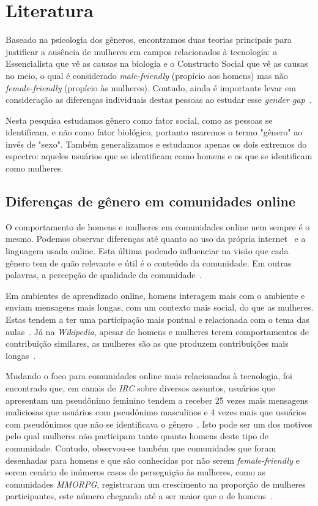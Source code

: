 \chapter{Literatura}

Baseado na psicologia dos gêneros, encontramos duas teorias principais para justificar a ausência de mulheres em campos relacionados à tecnologia: a Essencialista que vê as causas na biologia e o Constructo Social que vê as causas no meio, o qual é considerado \emph{male-friendly} (propício aos homens) mas não \emph{female-friendly} (propício às mulheres). Contudo, ainda é importante levar em consideração as diferenças individuais destas pessoas ao estudar esse \emph{gender gap}~\cite{trauth2004understanding}.

Nesta pesquisa estudamos gênero como fator social, como as pessoas se identificam, e não como fator biológico, portanto usaremos o termo "gênero" ao invés de "sexo". Também generalizamos e estudamos apenas os dois extremos do espectro: aqueles usuários que se identificam como homens e os que se identificam como mulheres. 

\section{Diferenças de gênero em comunidades online}

O comportamento de homens e mulheres em comunidades online nem sempre é o mesmo. Podemos observar diferenças até quanto ao uso da própria internet~\cite{hargittai2006differences} e a linguagem usada online. Esta última podendo influenciar na visão que cada gênero tem  de quão relevante e útil é o conteúdo da comunidade. Em outras palavras, a percepção de qualidade da comunidade~\cite{Gefen:2005:YSS:1066149.1066156}.

Em ambientes de aprendizado online, homens interagem mais com o ambiente e enviam mensagens mais longas, com um contexto mais social, do que as mulheres. Estas tendem a ter uma participação mais pontual e relacionada com o tema das aulas~\cite{barrett1999gender}. Já na \emph{Wikipedia}, apesar de homens e mulheres terem comportamentos de contribuição similares, as mulheres são as que produzem contribuições mais longas~\cite{glott2010wikipedia}.

Mudando o foco para comunidades online mais relacionadas à tecnologia, foi encontrado que, em canais de \emph{IRC} sobre diversos assuntos, usuários que apresentam um pseudônimo feminino tendem a receber 25 vezes mais mensagens maliciosas que usuários com pseudônimo masculinos e 4 vezes mais que usuários com pseudônimos que não se identificava o gênero~\cite{meyer2006assessing}. Isto pode ser um dos motivos pelo qual mulheres não participam tanto quanto homens deste tipo de comunidade. Contudo, observou-se também que comunidades que foram desenhadas para homens e que são conhecidas por não serem \textit{female-friendly} e serem cenário de inúmeros casos de perseguição às mulheres, como as comunidades \emph{MMORPG}, registraram um crescimento na proporção de mulheres participantes, este número chegando até a ser maior que o de homens~\cite{taylor2003multiple}. 

